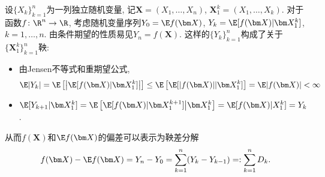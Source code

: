 设$\{X_k\}_{k=1}^n$为一列独立随机变量, 记$\bm X = (X_1, \dots, X_n)$, $\bm X_1^k = (X_1, \dots, X_k)$. 
对于函数$f \colon \R^n \to \R$, 考虑随机变量序列$Y_0 = \E f(\bm X)$, $Y_k = \E[f(\bm X)|\bm X_1^k]$, $k = 1, \dots, n$. 
由条件期望的性质易见$Y_n = f(\bm X)$. 
这样的$\{Y_k\}_{k=1}^n$构成了关于$\{\bm X_1^k\}_{k=1}^n$鞅: 
\begin{itemize}
	\item 由Jensen不等式和重期望公式, 
		\begin{equation*}
			\E |Y_k| 
			= \E\left[\left|\E[f(\bm X)|\bm X_1^k]\right|\right] 
			\leq \E\left[\E[|f(\bm X)||\bm X_1^k] \right]
			= \E |f(\bm X)|
			< \infty
		\end{equation*}
	\item $\E[Y_{k+1}|\bm X_1^k] = \E\left[\E[f(\bm X)|\bm X_1^{k+1}] \big|\bm X_1^k\right] = \E[f(\bm X) | X_1^k] = Y_k$. 
\end{itemize}
从而$f(\bm X)$和$\E f(\bm X)$的偏差可以表示为鞅差分解
\begin{equation*}
	f(\bm X) - \E f(\bm X) 
	= Y_n - Y_0 
	= \sum_{k=1}^n (Y_k - Y_{k-1})
	=: \sum_{k=1}^n D_k.
\end{equation*}

